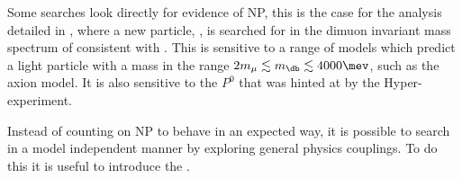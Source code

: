 Some searches look directly for evidence of NP, this is the case for the analysis detailed in
, where a new particle, \db, is searched for in the dimuon invariant mass spectrum of
\decay{\Bd}{\Kstarent\mumu} consistent with \decay{\db}{\mumu}.
This is sensitive to a range of models which predict a light particle with a mass in the range
$2m_\mu\lesssim m_\db\lesssim4000\mev$, such as the axion model.
It is also sensitive to the $P^0$ that was hinted at by the Hyper-\CP experiment.

Instead of counting on NP to behave in an expected way, it is possible to search in a model
independent manner by exploring general physics couplings.
To do this it is useful to introduce the \OPE.


